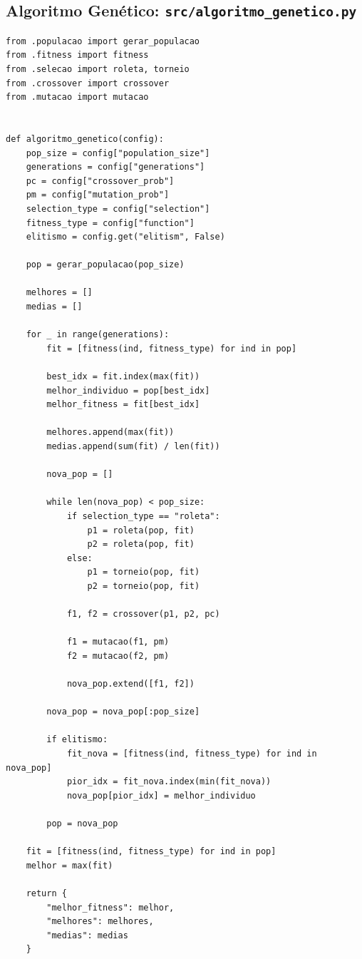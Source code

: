 \documentclass[a4paper,12pt]{article}
\begin{document}
\newpage
\subsection{Algoritmo Genético: \texttt{src/algoritmo\_genetico.py}}

\begin{lstlisting}[caption={src/algoritmo\_genetico.py}]
from .populacao import gerar_populacao
from .fitness import fitness
from .selecao import roleta, torneio
from .crossover import crossover
from .mutacao import mutacao


def algoritmo_genetico(config):
    pop_size = config["population_size"]
    generations = config["generations"]
    pc = config["crossover_prob"]
    pm = config["mutation_prob"]
    selection_type = config["selection"]
    fitness_type = config["function"]
    elitismo = config.get("elitism", False)
    
    pop = gerar_populacao(pop_size)

    melhores = []
    medias = []

    for _ in range(generations):
        fit = [fitness(ind, fitness_type) for ind in pop]

        best_idx = fit.index(max(fit))
        melhor_individuo = pop[best_idx]
        melhor_fitness = fit[best_idx]

        melhores.append(max(fit))
        medias.append(sum(fit) / len(fit))

        nova_pop = []

        while len(nova_pop) < pop_size:
            if selection_type == "roleta":
                p1 = roleta(pop, fit)
                p2 = roleta(pop, fit)
            else:
                p1 = torneio(pop, fit)
                p2 = torneio(pop, fit)

            f1, f2 = crossover(p1, p2, pc)

            f1 = mutacao(f1, pm)
            f2 = mutacao(f2, pm)

            nova_pop.extend([f1, f2])

        nova_pop = nova_pop[:pop_size]

        if elitismo:
            fit_nova = [fitness(ind, fitness_type) for ind in nova_pop]
            pior_idx = fit_nova.index(min(fit_nova))
            nova_pop[pior_idx] = melhor_individuo

        pop = nova_pop

    fit = [fitness(ind, fitness_type) for ind in pop]
    melhor = max(fit)

    return {
        "melhor_fitness": melhor,
        "melhores": melhores,
        "medias": medias
    }
\end{lstlisting}
\end{document}

